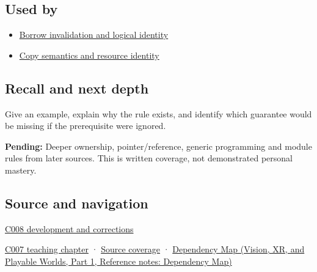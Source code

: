 \subsection{Used by}\label{appendix-f1581457d322-used-by}

\hypertarget{appendix-f1581457d322-used-by}{}

\begin{itemize}
\tightlist
\item
  \hyperref[appendix-f9b8b9188c7f]{Borrow invalidation and logical identity}
\item
  \hyperref[appendix-1340cd1ce582]{Copy semantics and resource identity}
\end{itemize}

\subsection{Recall and next depth}\label{appendix-f1581457d322-recall-and-next-depth}

\hypertarget{appendix-f1581457d322-recall-and-next-depth}{}

Give an example, explain why the rule exists, and identify which guarantee would be missing if the prerequisite were ignored.

\textbf{Pending:} Deeper ownership, pointer/reference, generic programming and module rules from later sources. This is written coverage, not demonstrated personal mastery.

\subsection{Source and navigation}\label{appendix-f1581457d322-source-and-navigation}

\hypertarget{appendix-f1581457d322-source-and-navigation}{}

\hyperref[appendix-fd090d982a15-m008---parts-113-126]{C008 development and corrections}

\hyperref[01-foundations-i-ch002-values-occupants-and-addresses-tell-different-stories]{C007 teaching chapter} · \hyperref[appendix-fd090d982a15-m007---parts-101-112]{Source coverage} · \href{../07-Vision-XR-and-Playable-Worlds-P01/main.pdf\#appendix-4ad47bdd269a}{Dependency Map (Vision, XR, and Playable Worlds, Part 1, Reference notes: Dependency Map)}
